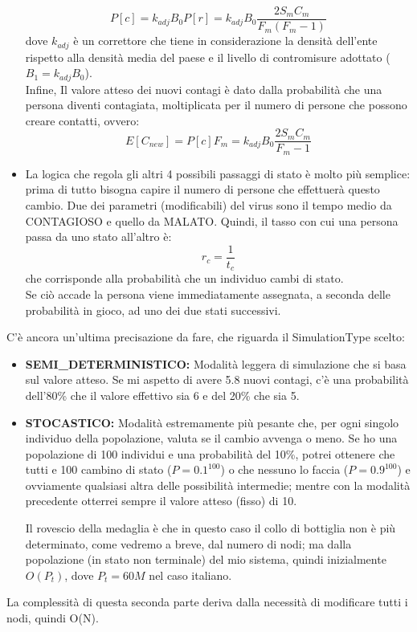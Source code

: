 \documentclass[a4paper, 12pt]{article}
\begin{document}
\begin{itemize}
			\begin{equation}
				P[c] = k_{adj} B_{0} P[r] = k_{adj} B_{0} \dfrac{2 S_{m} C_{m}}{F_{m}(F_{m}-1)}
			\end{equation}
			dove $k_{adj}$ è un correttore che tiene in considerazione la densità dell'ente rispetto alla densità media del paese e il livello di contromisure adottato ($B_{1} = k_{adj} B_{0}$).\\
			Infine, Il valore atteso dei nuovi contagi è dato dalla probabilità che una persona diventi contagiata, moltiplicata per il numero di persone che possono creare contatti, ovvero:
			\begin{equation}
				E[C_{new}] = P[c] F_{m} = k_{adj} B_{0} \dfrac{2 S_{m} C_{m}}{F_{m}-1}
			\end{equation}
			\item La logica che regola gli altri 4 possibili passaggi di stato è molto più semplice: prima di tutto bisogna capire il numero di persone che effettuerà questo cambio.
			Due dei parametri (modificabili) del virus sono il tempo medio da CONTAGIOSO e quello da MALATO.
			Quindi, il tasso con cui una persona passa da uno stato all'altro è:
			\begin{equation}
				r_{c} = \dfrac{1}{t_{c}}
			\end{equation}
			che corrisponde alla probabilità che un individuo cambi di stato.\\
			Se ciò accade la persona viene immediatamente assegnata, a seconda delle probabilità in gioco, ad uno dei due stati successivi.
		\end{itemize}
		C'è ancora un'ultima precisazione da fare, che riguarda il SimulationType scelto:
		\begin{itemize}
			\item \textbf{SEMI\_DETERMINISTICO:} Modalità leggera di simulazione che si basa sul valore atteso. Se mi aspetto di avere 5.8 nuovi contagi, c'è una probabilità dell'80\% che il valore effettivo sia 6 e del 20\% che sia 5.
			\item \textbf{STOCASTICO:} Modalità estremamente più pesante che, per ogni singolo individuo della popolazione, valuta se il cambio avvenga o meno.
			Se ho una popolazione di 100 individui e una probabilità del 10\%, potrei ottenere che tutti e 100 cambino di stato ($P = 0.1^{100}$) o che nessuno lo faccia ($P = 0.9^{100}$) e ovviamente qualsiasi altra delle possibilità intermedie; mentre con la modalità precedente otterrei sempre il valore atteso (fisso) di 10.
			
			Il rovescio della medaglia è che in questo caso il collo di bottiglia non è più determinato, come vedremo a breve, dal numero di nodi; ma dalla popolazione (in stato non terminale) del mio sistema, quindi inizialmente $O(P_{t})$, dove $P_{t} = 60M$ nel caso italiano.
		\end{itemize}
		La complessità di questa seconda parte deriva dalla necessità di modificare tutti i nodi, quindi O(N).
	
\end{document}
